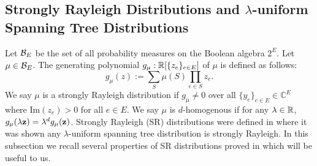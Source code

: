 





\def\ber{\textup{Ber}}
\def\bin{\textup{Bin}}
\def\Poi{\textup{Poi}}

\def\ber{\textup{Ber}}
\def\bin{\textup{Bin}}
\def\Poi{\textup{Poi}}

\subsection{Strongly Rayleigh Distributions and $\lambda$-uniform Spanning Tree Distributions}
\label{sec:SRdistns}
Let ${\cal B}_E$ be the set of all probability measures on the Boolean algebra $2^E$. 
Let $\mu\in{\cal B}_E$. The generating polynomial $g_\mu: \mathbb{R}[\{z_{e}\}_{e\in E}]$ of $\mu$ is defined as follows:
$$ g_\mu(z):=\sum_S \mu(S) \prod_{e\in S} z_e.$$
\hypertarget{tar:SR}{We say $\mu$ is a strongly Rayleigh distribution if $g_\mu\neq 0$ over all $\{y_e\}_{e\in E} \in \mathbb{C}^E$ where $\text{Im}(z_e)>0$ for all $e\in E$. We say $\mu$ is $d$-homogenous if for any $\lambda \in \mathbb{R}$, $g_\mu(\lambda {\bf z}) = \lambda^d g_\mu({\bf z})$.}
Strongly Rayleigh (SR) distributions were defined in \cite{BBL09} where it was shown any $\lambda$-uniform spanning tree distribution is strongly Rayleigh. In this subsection we recall several properties of SR distributions proved in \cite{BBL09,OSS11} which will be useful to us.


